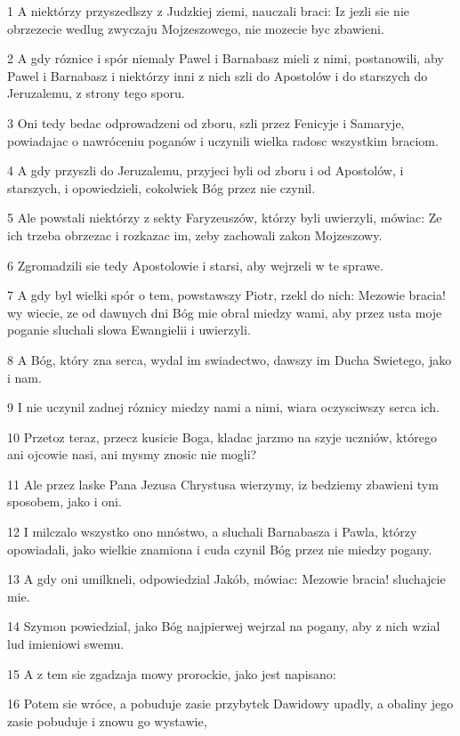 \par 1 A niektórzy przyszedlszy z Judzkiej ziemi, nauczali braci: Iz jezli sie nie obrzezecie wedlug zwyczaju Mojzeszowego, nie mozecie byc zbawieni.
\par 2 A gdy róznice i spór niemaly Pawel i Barnabasz mieli z nimi, postanowili, aby Pawel i Barnabasz i niektórzy inni z nich szli do Apostolów i do starszych do Jeruzalemu, z strony tego sporu.
\par 3 Oni tedy bedac odprowadzeni od zboru, szli przez Fenicyje i Samaryje, powiadajac o nawróceniu poganów i uczynili wielka radosc wszystkim braciom.
\par 4 A gdy przyszli do Jeruzalemu, przyjeci byli od zboru i od Apostolów, i starszych, i opowiedzieli, cokolwiek Bóg przez nie czynil.
\par 5 Ale powstali niektórzy z sekty Faryzeuszów, którzy byli uwierzyli, mówiac: Ze ich trzeba obrzezac i rozkazac im, zeby zachowali zakon Mojzeszowy.
\par 6 Zgromadzili sie tedy Apostolowie i starsi, aby wejrzeli w te sprawe.
\par 7 A gdy byl wielki spór o tem, powstawszy Piotr, rzekl do nich: Mezowie bracia! wy wiecie, ze od dawnych dni Bóg mie obral miedzy wami, aby przez usta moje poganie sluchali slowa Ewangielii i uwierzyli.
\par 8 A Bóg, który zna serca, wydal im swiadectwo, dawszy im Ducha Swietego, jako i nam.
\par 9 I nie uczynil zadnej róznicy miedzy nami a nimi, wiara oczysciwszy serca ich.
\par 10 Przetoz teraz, przecz kusicie Boga, kladac jarzmo na szyje uczniów, którego ani ojcowie nasi, ani mysmy znosic nie mogli?
\par 11 Ale przez laske Pana Jezusa Chrystusa wierzymy, iz bedziemy zbawieni tym sposobem, jako i oni.
\par 12 I milczalo wszystko ono mnóstwo, a sluchali Barnabasza i Pawla, którzy opowiadali, jako wielkie znamiona i cuda czynil Bóg przez nie miedzy pogany.
\par 13 A gdy oni umilkneli, odpowiedzial Jakób, mówiac: Mezowie bracia! sluchajcie mie.
\par 14 Szymon powiedzial, jako Bóg najpierwej wejrzal na pogany, aby z nich wzial lud imieniowi swemu.
\par 15 A z tem sie zgadzaja mowy prorockie, jako jest napisano:
\par 16 Potem sie wróce, a pobuduje zasie przybytek Dawidowy upadly, a obaliny jego zasie pobuduje i znowu go wystawie,
